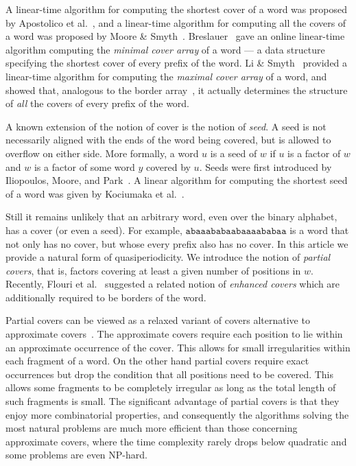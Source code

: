 \documentclass{article}
\theoremstyle{theorem}
\theoremstyle{definition}
\begin{document}
    A linear-time algorithm for computing the shortest cover of a word was proposed
    by Apostolico et al.~\cite{DBLP:journals/ipl/ApostolicoFI91}, and a linear-time
    algorithm for computing all the covers of a word was proposed by
    Moore \& Smyth~\cite{DBLP:journals/ipl/MooreS94}. Breslauer~\cite{DBLP:journals/ipl/Breslauer92}
    gave an online linear-time algorithm computing the {\em minimal cover array} of a word --- a data 
    structure specifying the shortest cover of every prefix of the word.
    Li \& Smyth~\cite{DBLP:journals/algorithmica/LiS02} provided a linear-time algorithm
    for computing the {\em maximal cover array} of a word, and showed that, analogous to
    the border array~\cite{AlgorithmsOnStrings}, it actually determines the structure of {\em all} the covers of every prefix of the word.

    A known extension of the notion of cover is the notion of \emph{seed}.
    A seed is not necessarily aligned with the ends of the word being covered,
    but is allowed to overflow on either side.
    More formally, a word $u$ is a seed of $w$ if $u$ is a factor of $w$ and $w$ is a factor of some
    word $y$ covered by $u$.
    Seeds were first introduced by Iliopoulos, Moore, and Park~\cite{DBLP:journals/algorithmica/IliopoulosMP96}.
    A linear algorithm for computing the shortest seed of a word was given
    by Kociumaka et al.~\cite{DBLP:conf/soda/KociumakaKRRW12}.

    Still it remains unlikely that an arbitrary word, even over the binary alphabet,
    has a cover (or even a seed).
    For example, $\texttt{abaaababaabaaaababaa}$ is a word that not only has no cover, 
    but whose every prefix also has no cover.    
    In this article we provide a natural form of quasiperiodicity.
    We introduce the notion of \emph{partial covers}, that is, factors covering at least a given number of positions in $w$.
    Recently, Flouri et al.~\cite{Flouri2013102} suggested a related notion of \emph{enhanced covers}
    which are additionally required to be borders of the word.
    
    Partial covers can be viewed as a relaxed variant of covers
    alternative to approximate covers~\cite{SimParkKimLee}.
    The approximate covers require each position to lie within an
    approximate occurrence of the cover. This allows for small irregularities
    within each fragment of a word.
    On the other hand partial covers require exact occurrences but drop
    the condition that all positions need to be covered. This allows some
    fragments to be completely irregular as long as the total length of such
    fragments is small.
    The significant advantage of partial covers is that they enjoy more
    combinatorial properties, and consequently the algorithms solving the most
    natural problems are much more efficient than those concerning approximate
    covers, where the time complexity rarely drops below quadratic and
    some problems are even NP-hard. 
    
\end{document}
